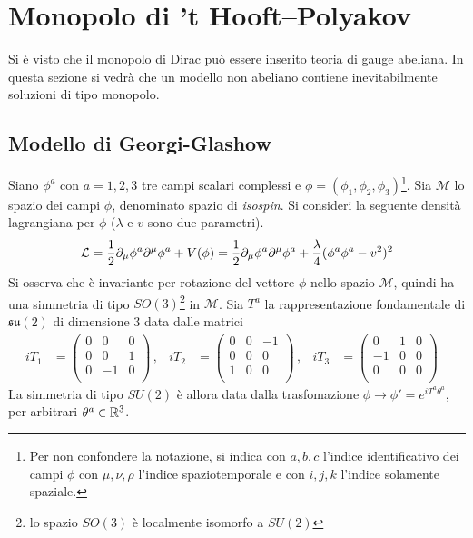 \section{Monopolo di ’t Hooft–Polyakov}
Si è visto che il monopolo di Dirac può essere inserito teoria di gauge abeliana.
In questa sezione si vedrà che un modello non abeliano contiene inevitabilmente
soluzioni di tipo monopolo.
\subsection{Modello di Georgi-Glashow}
Siano $\phi^a$ con $a=1,2,3$ tre campi scalari complessi e $\phi =
(\phi _1, \phi _2,\phi _3)$\footnote{
   Per non confondere la notazione, si indica con $a,b,c$ l'indice identificativo
   dei campi $\phi$ con $\mu,\nu,\rho$ l'indice spaziotemporale e con $i,j,k$
   l'indice solamente spaziale.
}.
Sia $\mathcal{M}$ lo spazio dei campi $\phi$, denominato spazio di \emph{isospin}.
Si consideri la seguente densità lagrangiana per $\phi$ ($\lambda$ e $v$ sono due
parametri).
$$
   \mathcal{L} = \frac{1}{2} \partial _\mu \phi ^a \partial ^\mu \phi^a
                + V(\phi)
               = \frac{1}{2} \partial _\mu \phi ^a \partial ^\mu \phi^a
                + \frac{\lambda}{4}( \phi^a \phi^a - v^2 )^2
$$
Si osserva che è invariante per rotazione del vettore $\phi$ nello spazio $\mathcal{M}$,
quindi ha una simmetria di tipo $SO(3)$\footnote{
  lo spazio $SO(3)$ è localmente isomorfo a $SU(2)$
} in $\mathcal{M}$.
Sia ${T^a}$ la rappresentazione fondamentale di $\mathfrak{su(2)}$ di dimensione 3
data dalle matrici
\begin{equation}
   \begin{aligned}
      i T_1 & = \begin{pmatrix}
                   0  & 0  & 0 \\
                   0  & 0  & 1 \\
                   0  & -1 & 0 \\
                 \end{pmatrix} \, , &
      i T_2 & = \begin{pmatrix}
                   0  & 0  & -1 \\
                   0  & 0  & 0 \\
                   1  & 0  & 0 \\
                 \end{pmatrix} \, , &
      i T_3 & = \begin{pmatrix}
                   0  & 1  & 0 \\
                   -1 & 0  & 0 \\
                   0  & 0  & 0 \\
                \end{pmatrix} &
   \end{aligned}
\end{equation}
La simmetria di tipo $SU(2)$ è allora data dalla trasfomazione
$\phi \to \phi' = e^{iT^a\theta^a}$, per arbitrari $\theta^a \in \mathbb{R} ^3 $.\\

